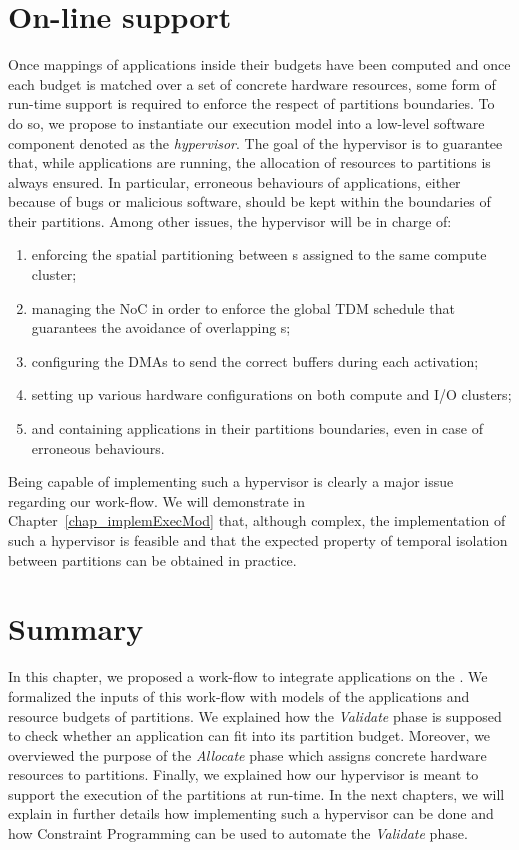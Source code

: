 \documentclass[main.tex]{subfiles}
\begin{document}
\section{On-line support}
\label{sec_framework_onLineSupport}
Once mappings of applications inside their budgets have been computed and once each budget is matched over a set of concrete hardware resources, some form of run-time support is required to enforce the respect of partitions boundaries. To do so, we propose to instantiate our execution model into a low-level software component denoted as the \emph{hypervisor}. The goal of the hypervisor is to guarantee that, while applications are running, the allocation of resources to partitions is always ensured. In particular, erroneous behaviours of applications, either because of bugs or malicious software, should be kept within the boundaries of their partitions. Among other issues, the hypervisor will be in charge of:
\begin{enumerate}
    \item enforcing the spatial partitioning between \PN{}s assigned to the same compute cluster;
    \item managing the NoC in order to enforce the global TDM schedule that guarantees the avoidance of overlapping \PC{}s;
    \item configuring the DMAs to send the correct buffers during each \PC{} activation;
    \item setting up various hardware configurations on both compute and I/O clusters;
    \item and containing applications in their partitions boundaries, even in case of erroneous behaviours.
\end{enumerate}
Being capable of implementing such a hypervisor is clearly a major issue regarding our work-flow. We will demonstrate in  Chapter~\ref{chap_implemExecMod} that, although complex, the implementation of such a hypervisor is feasible and that the expected property of temporal isolation between partitions can be obtained in practice.

\section{Summary}
In this chapter, we proposed a work-flow to integrate applications on the \mppalong. We formalized the inputs of this work-flow with models of the applications and resource budgets of partitions. We explained how the \emph{Validate} phase is supposed to check whether an application can fit into its partition budget. Moreover, we overviewed the purpose of the \emph{Allocate} phase which assigns concrete hardware resources to partitions. Finally, we explained how our hypervisor is meant to support the execution of the partitions at run-time. In the next chapters, we will explain in further details how implementing such a hypervisor can be done and how Constraint Programming can be used to automate the \emph{Validate} phase.


\clearpage
\subbiblio
\end{document}
